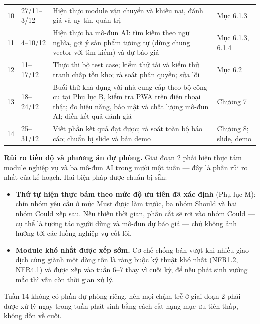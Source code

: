\begin{longtable}{L{1.48cm} L{2.32cm} L{6.95cm} L{3.79cm}}
10 & 27/11--3/12 & Hiện thực module vận chuyển và khiếu nại, đánh giá và uy tín, quản trị & Mục 6.1.3 \\
11 & 4--10/12 & Hiện thực ba mô-đun AI: tìm kiếm theo ngữ nghĩa, gợi ý sản phẩm tương tự (dùng chung vector với tìm kiếm) và dự báo giá & Mục 6.1.3, 6.1.4 \\
12 & 11--17/12 & Thực thi bộ test case; kiểm thử tải và kiểm thử tranh chấp tồn kho; rà soát phân quyền; sửa lỗi & Mục 6.2 \\
13 & 18--24/12 & Buổi thử khả dụng với nhà cung cấp theo bộ công cụ tại Phụ lục B, kiểm tra PWA trên điện thoại thật; đo hiệu năng, bảo mật và chất lượng mô-đun AI; điền kết quả đánh giá & Chương 7 \\
14 & 25--31/12 & Viết phần kết quả đạt được; rà soát toàn bộ báo cáo; chuẩn bị slide và bản demo & Chương 8; slide, demo \\
\end{longtable}
\endgroup

\noindent\textbf{Rủi ro tiến độ và phương án dự phòng.} Giai đoạn 2 phải hiện thực tám module nghiệp vụ và ba mô-đun AI trong mười một tuần --- đây là phần rủi ro nhất của kế hoạch. Hai biện pháp được chuẩn bị sẵn:

\begin{itemize}
    \item \textbf{Thứ tự hiện thực bám theo mức độ ưu tiên đã xác định} (Phụ lục M): chín nhóm yêu cầu ở mức Must được làm trước, ba nhóm Should và hai nhóm Could xếp sau. Nếu thiếu thời gian, phần cắt sẽ rơi vào nhóm Could --- cụ thể là tương tác người dùng và mô-đun dự báo giá --- chứ không ảnh hưởng tới các luồng nghiệp vụ cốt lõi.
    \item \textbf{Module khó nhất được xếp sớm.} Cơ chế chống bán vượt khi nhiều giao dịch cùng giành một dòng tồn là ràng buộc kỹ thuật khó nhất (NFR1.2, NFR4.1) và được xếp vào tuần 6--7 thay vì cuối kỳ, để nếu phát sinh vướng mắc thì vẫn còn thời gian xử lý.
\end{itemize}

\noindent Tuần 14 không có phần dự phòng riêng, nên mọi chậm trễ ở giai đoạn 2 phải được xử lý ngay trong tuần phát sinh bằng cách cắt hạng mục ưu tiên thấp, không dồn về cuối.
